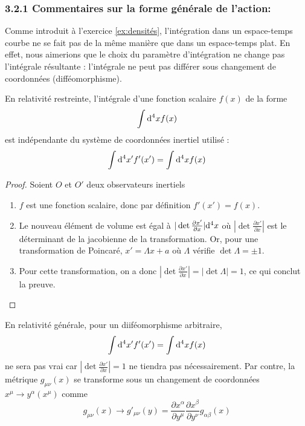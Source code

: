 \subsubsection{3.2.1 Commentaires sur la forme générale de l'action:}
Comme introduit à l'exercice \ref{ex:densités}, l'intégration dans un espace-temps courbe ne se fait pas de la même manière que dans un espace-temps plat. En effet, nous aimerions que le choix du paramètre d'intégration ne change pas l'intégrale résultante : l'intégrale ne peut pas différer sous changement de coordonnées (difféomorphisme).
\begin{theoremframe}
    \begin{propri}
        En relativité restreinte, l'intégrale d'une fonction scalaire $f(x)$ de la forme $$\int \mathrm{d} ^4x f(x)$$ est indépendante du système de coordonnées inertiel utilisé : $$\int \mathrm{d} ^4x' f'(x') = \int \mathrm{d} ^4x f(x)$$
    \end{propri}
\end{theoremframe}
\begin{proof}
    Soient $O$ et $O'$ deux observateurs inertiels
    \begin{enumerate}
        \item $f$ est une fonction scalaire, donc par définition $f'(x') = f(x)$.
        \item Le nouveau élément de volume est égal à $|\det \frac{\partial x'}{\partial x}|\mathrm{d} ^4x$ où $|\det \frac{\partial x'}{\partial x}|$ est le déterminant de la jacobienne de la transformation. Or, pour une transformation de Poincaré, $x' = \Lambda x + a$ où $\Lambda$ vérifie $\det \Lambda = \pm 1$. 
        \item Pour cette transformation, on a donc $|\det \frac{\partial x'}{\partial x}| = |\det \Lambda| = 1$, ce qui conclut la preuve.
\end{enumerate}
\end{proof}
En relativité générale, pour un diiféomorphisme arbitraire,
\begin{equation}
    \int \mathrm{d} ^4x' f'(x') = \int \mathrm{d} ^4x f(x)
\end{equation}
ne sera pas vrai car  $|\det \frac{\partial x'}{\partial x}| = 1$ ne tiendra pas nécessairement. Par contre, la métrique $g_{\mu \nu}(x)$ se transforme sous un changement de coordonnées $x^{\mu} \rightarrow y^{\alpha}(x^{\mu})$ comme
\begin{equation}
    g_{\mu \nu}(x) \rightarrow g'_{\mu \nu}(y) = \frac{\partial x^{\alpha}}{\partial y^{\mu}}\frac{\partial x^{\beta}}{\partial y^{\nu}}g_{\alpha \beta}(x)
\end{equation}
